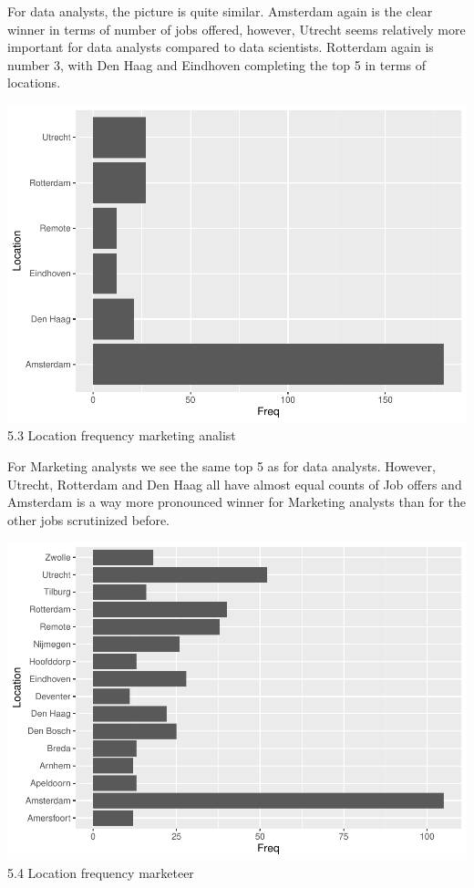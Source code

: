 \documentclass[
]{article}
\begin{document}
For data analysts, the picture is quite similar. Amsterdam again is the
clear winner in terms of number of jobs offered, however, Utrecht seems
relatively more important for data analysts compared to data scientists.
Rotterdam again is number 3, with Den Haag and Eindhoven completing the
top 5 in terms of locations.

\includegraphics{analysis_files/figure-latex/unnamed-chunk-29-1.pdf} 5.3
Location frequency marketing analist

For Marketing analysts we see the same top 5 as for data analysts.
However, Utrecht, Rotterdam and Den Haag all have almost equal counts of
Job offers and Amsterdam is a way more pronounced winner for Marketing
analysts than for the other jobs scrutinized before.

\includegraphics{analysis_files/figure-latex/unnamed-chunk-30-1.pdf} 5.4
Location frequency marketeer
\end{document}
